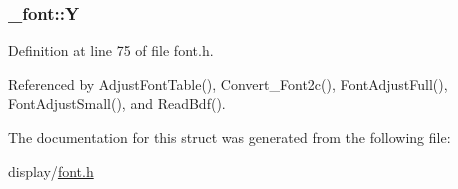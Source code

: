 \hypertarget{struct__font_a3c9fee9cfcc713b1aac812c14dd9a36a}{
\subsubsection[{Y}]{ \-\_\-font\-::\-Y}}\label{struct__font_a3c9fee9cfcc713b1aac812c14dd9a36a}


Definition at line 75 of file font.\-h.



Referenced by Adjust\-Font\-Table(), Convert\-\_\-\-Font2c(), Font\-Adjust\-Full(), Font\-Adjust\-Small(), and Read\-Bdf().



The documentation for this struct was generated from the following file\-:\begin{DoxyCompactItemize}
\item 
display/\hyperlink{display_2font_8h}{font.\-h}\end{DoxyCompactItemize}
